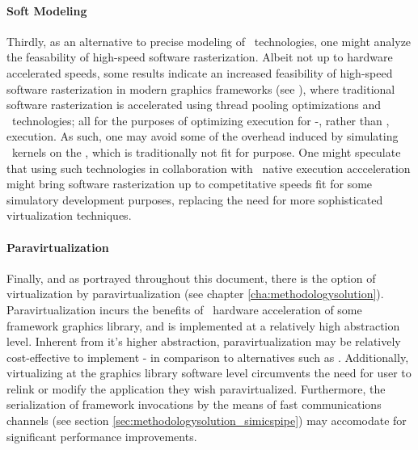 \paragraph{Soft Modeling}
\label{par:background_graphicsvirtualization_softmodeling}
Thirdly, as an alternative to precise modeling of \dvttermgpu\ technologies, one might analyze the feasability of high-speed software rasterization.
Albeit not up to hardware accelerated speeds, some results indicate an increased feasibility of high-speed software rasterization in modern graphics frameworks (see ), where traditional software rasterization is accelerated using thread pooling optimizations and \dvttermsimd\ technologies; all for the purposes of optimizing execution for \dvttermcpu -, rather than \dvttermgpu , execution.
As such, one may avoid some of the overhead induced by simulating \dvttermgpu\ kernels on the \dvttermcpu , which is traditionally not fit for purpose.
One might speculate that using such technologies in collaboration with \dvttermhost\ native execution accceleration might bring software rasterization up to competitative speeds fit for some simulatory development purposes, replacing the need for more sophisticated virtualization techniques.

\paragraph{Paravirtualization}
\label{par:background_graphicsvirtualization_paravirtualization}
Finally, and as portrayed throughout this document, there is the option of virtualization by paravirtualization (see chapter \ref{cha:methodologysolution}).
Paravirtualization incurs the benefits of \dvttermhost\ hardware acceleration of some framework graphics library, and is implemented at a relatively high abstraction level.
Inherent from it's higher abstraction, paravirtualization may be relatively cost-effective to implement - in comparison to alternatives such as .
Additionally, virtualizing at the graphics library software level circumvents the need for user to relink or modify the application they wish paravirtualized.
Furthermore, the serialization of framework invocations by the means of fast communications channels (see section \ref{sec:methodologysolution_simicspipe}) may accomodate for significant performance improvements.

